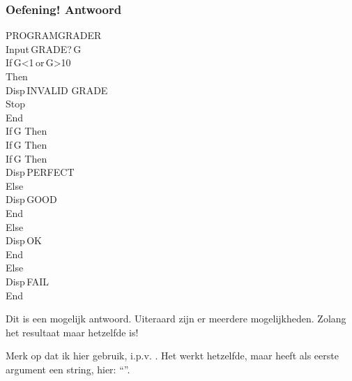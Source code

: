 \begin{frame}
\frametitle{Oefening! \tifonttxt{\>} Antwoord}

\begin{minipage}{0.4\textwidth}
\begin{ticalc}
	PROGRAM\:GRADER\\%
	\:Input\,\qt GRADE?\,\qt\comma G\\%
	\:If\,G<1\,or\,G>10\\%
	\:Then\\%
	\:Disp\,\qt INVALID GRADE\qt\\%
	\:Stop\\%
	\:End\\%
	\:If\,G
	\:Then\\%
	\:If\,G
	\:Then\\%
	\:If\,G
	\:Then\\%
	\:Disp\,\qt PERFECT\qt\\%
	\:Else\\%
	\:Disp\,\qt GOOD\qt\\%
	\:End\\%
	\:Else\\%
	\:Disp\,\qt OK\qt\\%
	\:End\\%
	\:Else\\%
	\:Disp\,\qt FAIL\qt\\%
	\:End
\end{ticalc}
\end{minipage}
\begin{minipage}{0.58\textwidth}
Dit is een mogelijk antwoord.
Uiteraard zijn er meerdere mogelijkheden. Zolang het resultaat maar hetzelfde is!

\vspace{1cm}
Merk op dat ik hier  gebruik, i.p.v. .
Het werkt hetzelfde, maar heeft als eerste argument een string, hier: ``''.
\end{minipage}

\end{frame}







